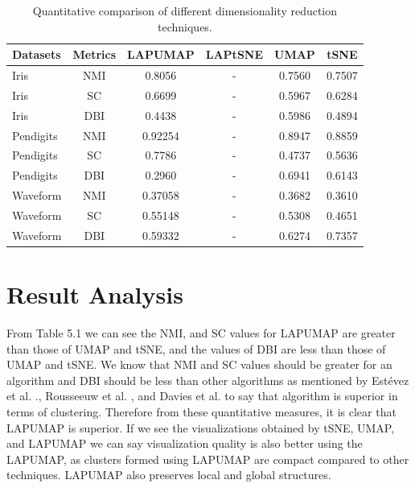 \begin{table}[H]
    \centering
    \begin{tabular}{lccccc}
        \toprule
       \textbf{Datasets} & \textbf{Metrics} & \textbf{LAPUMAP} & \textbf{LAPtSNE} & \textbf{UMAP} & \textbf{tSNE} \\
        \midrule
        Iris &NMI & 0.8056 & - & 0.7560 & 0.7507 \\
        Iris &SC  & 0.6699 & - & 0.5967& 0.6284 \\
        Iris &DBI & 0.4438& - & 0.5986 & 0.4894\\
        \midrule
        Pendigits &NMI & 0.92254& - & 0.8947& 0.8859 \\
        Pendigits &SC  & 0.7786& -& 0.4737& 0.5636 \\
        Pendigits &DBI & 0.2960 & - & 0.6941 & 0.6143\\
        \midrule
        Waveform &NMI & 0.37058 & - & 0.3682& 0.3610\\
        Waveform &SC  & 0.55148& - & 0.5308& 0.4651\\
        Waveform &DBI & 0.59332& -& 0.6274 & 0.7357\\
        
        \bottomrule
    \end{tabular}
    \caption{Quantitative comparison of different dimensionality reduction techniques.}
    \label{tab:dimensionality-reduction-detailed}
\end{table}
\section{Result Analysis}
From Table 5.1 we can see the NMI, and SC values for LAPUMAP are greater than those of UMAP and tSNE, and the values of DBI are less than those of UMAP and tSNE. We know that NMI and SC values should be greater for an algorithm and DBI should be less than other algorithms as mentioned by Estévez et al. .\cite{estevez2009normalized}, Rousseeuw et al. \cite{rousseeuw1987graphical}, and Davies et al.\cite{davies1979} to say that algorithm is superior in terms of clustering. Therefore from these quantitative measures, it is clear that LAPUMAP is superior. If we see the visualizations obtained by tSNE, UMAP, and  LAPUMAP we can say visualization quality is also better using the LAPUMAP, as clusters formed using  LAPUMAP are compact compared to other techniques. LAPUMAP also preserves local and global structures.